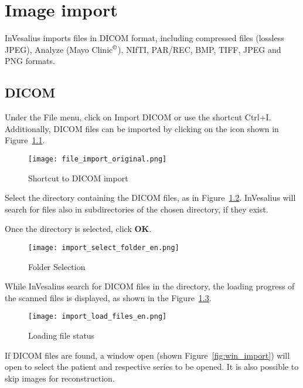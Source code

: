 \chapter{Image import}

InVesalius imports files in DICOM format, including compressed files (lossless JPEG), Analyze (Mayo Clinic$^\copyright$), NIfTI, PAR/REC, BMP, TIFF, JPEG and PNG formats.

\section{DICOM}

Under the File menu, click on Import DICOM or use the shortcut Ctrl+I. Additionally, DICOM files can be imported by clicking on the icon shown in Figure~\ref{fig:import}.

\begin{figure}[!htb]
\centering
\texttt{[image: file\_import\_original.png]}
\caption{Shortcut to DICOM import}
\label{fig:import}
\end{figure}

\hspace{.2cm}

Select the directory containing the DICOM files, as in Figure~\ref{fig:win_folder}. InVesalius will search for files also in subdirectories of the chosen directory,
if they exist.

\newpage

Once the directory is selected, click \textbf{OK}.

\begin{figure}[!htb]
\centering
\texttt{[image: import\_select\_folder\_en.png]}
\caption{Folder Selection}
\label{fig:win_folder}
\end{figure}

\hspace{.2cm}

While InVesalius search for DICOM files in the directory, the loading progress of the scanned files is displayed, as shown in the Figure~\ref{fig:ver_file}.

\begin{figure}[!htb]
\centering
\texttt{[image: import\_load\_files\_en.png]}
\caption{Loading file status}
\label{fig:ver_file}
\end{figure}

\newpage

If DICOM files are found, a window open (shown Figure~\ref{fig:win_import}) will open to select the patient and respective series to be opened. It is also possible to skip images for reconstruction.

